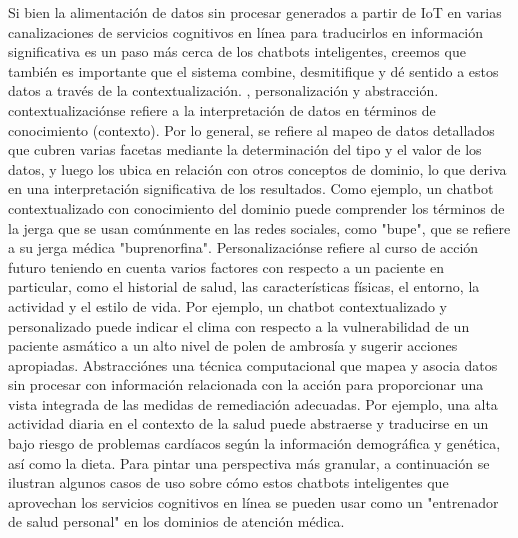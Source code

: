 Si bien la alimentación de datos sin procesar generados a partir de IoT en varias canalizaciones de servicios cognitivos en línea para traducirlos en información significativa es un paso más cerca de los chatbots inteligentes, creemos que también es importante que el sistema combine, desmitifique y dé sentido a estos datos a través de la contextualización. , personalización y abstracción. contextualizaciónse refiere a la interpretación de datos en términos de conocimiento (contexto). Por lo general, se refiere al mapeo de datos detallados que cubren varias facetas mediante la determinación del tipo y el valor de los datos, y luego los ubica en relación con otros conceptos de dominio, lo que deriva en una interpretación significativa de los resultados. Como ejemplo, un chatbot contextualizado con conocimiento del dominio puede comprender los términos de la jerga que se usan comúnmente en las redes sociales, como "bupe", que se refiere a su jerga médica "buprenorfina". Personalizaciónse refiere al curso de acción futuro teniendo en cuenta varios factores con respecto a un paciente en particular, como el historial de salud, las características físicas, el entorno, la actividad y el estilo de vida. Por ejemplo, un chatbot contextualizado y personalizado puede indicar el clima con respecto a la vulnerabilidad de un paciente asmático a un alto nivel de polen de ambrosía y sugerir acciones apropiadas. Abstracciónes una técnica computacional que mapea y asocia datos sin procesar con información relacionada con la acción para proporcionar una vista integrada de las medidas de remediación adecuadas. Por ejemplo, una alta actividad diaria en el contexto de la salud puede abstraerse y traducirse en un bajo riesgo de problemas cardíacos según la información demográfica y genética, así como la dieta. Para pintar una perspectiva más granular, a continuación se ilustran algunos casos de uso sobre cómo estos chatbots inteligentes que aprovechan los servicios cognitivos en línea se pueden usar como un "entrenador de salud personal" en los dominios de atención médica.
